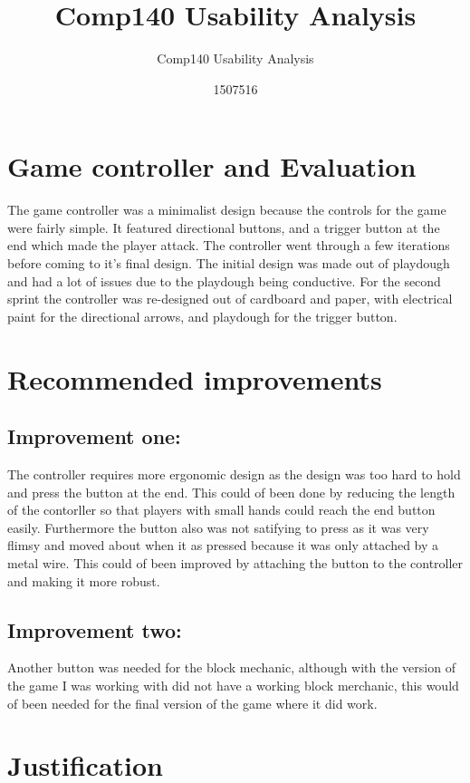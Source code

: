 \documentclass{scrartcl}
\title{Comp140 Usability Analysis}
\subtitle{Comp140 Usability Analysis}
\author{1507516}
\begin{document}
\maketitle

\abstract{}

\section{Game controller and Evaluation}

The game controller was a minimalist design because the controls for the game were fairly simple. It featured directional buttons, and a trigger button at the end which made the player attack. The controller went through a few iterations before coming to it's final design. The initial design was made out of playdough and had a lot of issues due to the playdough being conductive. For the second sprint the controller was re-designed out of cardboard and paper, with electrical paint for the directional arrows, and playdough for the trigger button.

\section{Recommended improvements}

\subsection{Improvement one:}
The controller requires more ergonomic design as the design was too hard to hold and press the button at the end. This could of been done by reducing the length of the contorller so that players with small hands could reach the end button easily. Furthermore the button also was not satifying to press as it was very flimsy and moved about when it as pressed because it was only attached by a metal wire. This could of been improved by attaching the button to the controller and making it more robust.

\subsection{Improvement two:}
Another button was needed for the block mechanic, although with the version of the game I was working with did not have a working block merchanic, this would of been needed for the final version of the game where it did work.

\section{Justification}



\end{document}
